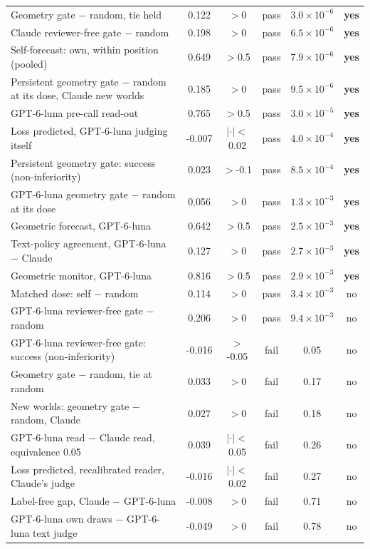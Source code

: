 \begin{center}
\begin{tabular}{@{}lccccc@{}}
Geometry gate $-$ random, tie held & 0.122 & $>$0 & pass & $3.0\times10^{-6}$ & \textbf{yes}\\
Claude reviewer-free gate $-$ random & 0.198 & $>$0 & pass & $6.5\times10^{-6}$ & \textbf{yes}\\
Self-forecast: own, within position (pooled) & 0.649 & $>$0.5 & pass & $7.9\times10^{-6}$ & \textbf{yes}\\
Persistent geometry gate $-$ random at its dose, Claude new worlds & 0.185 & $>$0 & pass & $9.5\times10^{-6}$ & \textbf{yes}\\
GPT-6-luna pre-call read-out & 0.765 & $>$0.5 & pass & $3.0\times10^{-5}$ & \textbf{yes}\\
Loss predicted, GPT-6-luna judging itself & -0.007 & $|\cdot|<$0.02 & pass & $4.0\times10^{-4}$ & \textbf{yes}\\
Persistent geometry gate: success (non-inferiority) & 0.023 & $>$-0.1 & pass & $8.5\times10^{-4}$ & \textbf{yes}\\
GPT-6-luna geometry gate $-$ random at its dose & 0.056 & $>$0 & pass & $1.3\times10^{-3}$ & \textbf{yes}\\
Geometric forecast, GPT-6-luna & 0.642 & $>$0.5 & pass & $2.5\times10^{-3}$ & \textbf{yes}\\
Text-policy agreement, GPT-6-luna $-$ Claude & 0.127 & $>$0 & pass & $2.7\times10^{-3}$ & \textbf{yes}\\
Geometric monitor, GPT-6-luna & 0.816 & $>$0.5 & pass & $2.9\times10^{-3}$ & \textbf{yes}\\
Matched dose: self $-$ random & 0.114 & $>$0 & pass & $3.4\times10^{-3}$ & no\\
GPT-6-luna reviewer-free gate $-$ random & 0.206 & $>$0 & pass & $9.4\times10^{-3}$ & no\\
GPT-6-luna reviewer-free gate: success (non-inferiority) & -0.016 & $>$-0.05 & fail & 0.05 & no\\
Geometry gate $-$ random, tie at random & 0.033 & $>$0 & fail & 0.17 & no\\
New worlds: geometry gate $-$ random, Claude & 0.027 & $>$0 & fail & 0.18 & no\\
GPT-6-luna read $-$ Claude read, equivalence 0.05 & 0.039 & $|\cdot|<$0.05 & fail & 0.26 & no\\
Loss predicted, recalibrated reader, Claude's judge & -0.016 & $|\cdot|<$0.02 & fail & 0.27 & no\\
Label-free gap, Claude $-$ GPT-6-luna & -0.008 & $>$0 & fail & 0.71 & no\\
GPT-6-luna own draws $-$ GPT-6-luna text judge & -0.049 & $>$0 & fail & 0.78 & no\\

\end{tabular}
\end{center}
